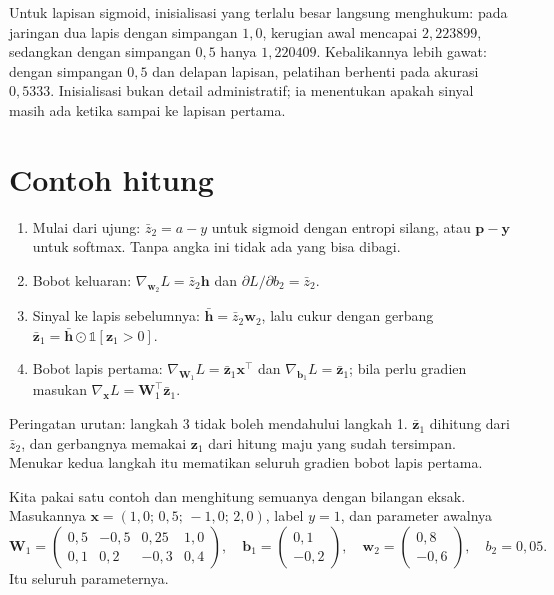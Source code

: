 Untuk lapisan sigmoid, inisialisasi yang terlalu besar langsung menghukum: pada jaringan dua lapis dengan simpangan $1{,}0$, kerugian awal mencapai $2{,}223899$, sedangkan dengan simpangan $0{,}5$ hanya $1{,}220409$. Kebalikannya lebih gawat: dengan simpangan $0{,}5$ dan delapan lapisan, pelatihan berhenti pada akurasi $0{,}5333$.
Inisialisasi bukan detail administratif; ia menentukan apakah sinyal masih ada ketika
sampai ke lapisan pertama.

\section{Contoh hitung}

\begin{resep}
\begin{enumerate}
  \item Mulai dari ujung: $\bar{z}_{2}=a-y$ untuk sigmoid dengan entropi silang, atau
        $\mathbf{p}-\mathbf{y}$ untuk softmax. Tanpa angka ini tidak ada yang bisa dibagi.
  \item Bobot keluaran: $\nabla_{\mathbf{w}_{2}}L=\bar{z}_{2}\mathbf{h}$ dan
        $\partial L/\partial b_{2}=\bar{z}_{2}$.
  \item Sinyal ke lapis sebelumnya: $\bar{\mathbf{h}}=\bar{z}_{2}\mathbf{w}_{2}$, lalu
        cukur dengan gerbang
        $\bar{\mathbf{z}}_{1}=\bar{\mathbf{h}}\odot\mathbb{1}[\mathbf{z}_{1}>0]$.
  \item Bobot lapis pertama: $\nabla_{\mathbf{W}_{1}}L=\bar{\mathbf{z}}_{1}\mathbf{x}^{\top}$
        dan $\nabla_{\mathbf{b}_{1}}L=\bar{\mathbf{z}}_{1}$; bila perlu gradien masukan
        $\nabla_{\mathbf{x}}L=\mathbf{W}_{1}^{\top}\bar{\mathbf{z}}_{1}$.
\end{enumerate}
Peringatan urutan: langkah 3 tidak boleh mendahului langkah 1. $\bar{\mathbf{z}}_{1}$
dihitung dari $\bar{z}_{2}$, dan gerbangnya memakai $\mathbf{z}_{1}$ dari hitung maju
yang sudah tersimpan. Menukar kedua langkah itu mematikan seluruh gradien bobot lapis
pertama.
\end{resep}


Kita pakai satu contoh dan menghitung semuanya dengan bilangan eksak. Masukannya
$\mathbf{x}=(1{,}0;\,0{,}5;\,-1{,}0;\,2{,}0)$, label $y=1$, dan parameter awalnya
\[
  \mathbf{W}_{1}=\begin{pmatrix}
  0{,}5&-0{,}5&0{,}25&1{,}0\\
  0{,}1&0{,}2&-0{,}3&0{,}4\end{pmatrix},\quad
  \mathbf{b}_{1}=\begin{pmatrix}0{,}1\\-0{,}2\end{pmatrix},\quad
  \mathbf{w}_{2}=\begin{pmatrix}0{,}8\\-0{,}6\end{pmatrix},\quad b_{2}=0{,}05 .
\]
Itu seluruh parameternya.

